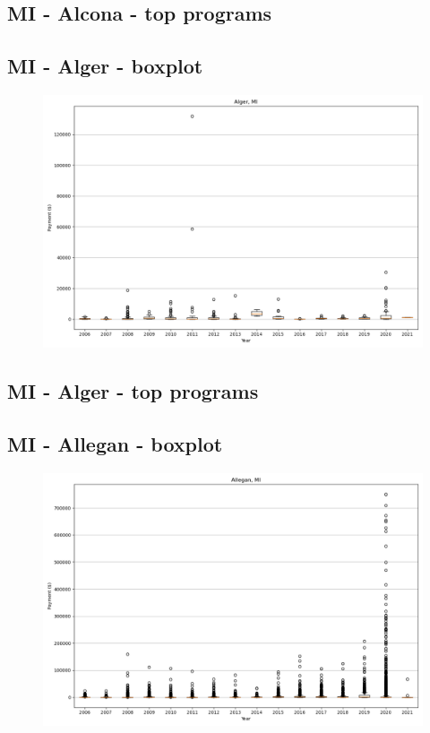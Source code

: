 \subsection*{MI - Alcona - top programs}

\newpage
\subsection*{MI - Alger - boxplot}
\begin{figure}[h]
\centering
\includegraphics[width=7in]{../output/boxplots/counties/Alger-MI_boxplot.png}
\end{figure}


\subsection*{MI - Alger - top programs}

\newpage
\subsection*{MI - Allegan - boxplot}
\begin{figure}[h]
\centering
\includegraphics[width=7in]{../output/boxplots/counties/Allegan-MI_boxplot.png}
\end{figure}


